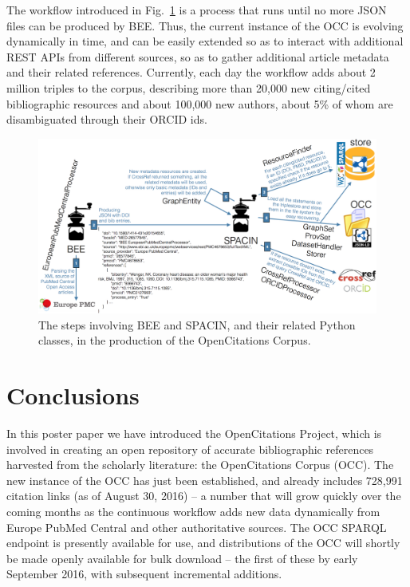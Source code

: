 \documentclass[runningheads,a4paper]{llncs}
\makeatletter
\def\maxwidth#1{\ifdim\Gin@nat@width>#1 #1\else\Gin@nat@width\fi}
\makeatother
\begin{document}
The workflow introduced in Fig.~\ref{refIllustration0} is a process that runs until no more JSON files can be produced by BEE. Thus, the current instance of the OCC is evolving dynamically in time, and can be easily extended so as to interact with additional REST APIs from different sources, so as to gather additional article metadata and their related references. Currently, each day the workflow adds about 2 million triples to the corpus, describing more than 20,000 new citing/cited bibliographic resources and about 100,000 new authors, about 5\% of whom are disambiguated through their ORCID ids.
\begin{figure}[h!]
\centering
\includegraphics[width=\maxwidth{\textwidth}]{img/1000020100000948000004D0192123CB.png}
\cprotect\caption{The steps involving BEE and SPACIN, and their related Python classes, in the production of the OpenCitations Corpus.}
\label{refIllustration0}
\end{figure}


\section{Conclusions}

In this poster paper we have introduced the OpenCitations Project, which is involved in creating an open repository of accurate bibliographic references harvested from the scholarly literature: the OpenCitations Corpus (OCC). The new instance of the OCC has just been established, and already includes 728,991 citation links (as of August 30, 2016) -- a number that will grow quickly over the coming months as the continuous workflow adds new data dynamically from Europe PubMed Central and other authoritative sources. The OCC SPARQL endpoint is presently available for use, and distributions of the OCC will shortly be made openly available for bulk download -- the first of these by early September 2016, with subsequent incremental additions.
\end{document}
